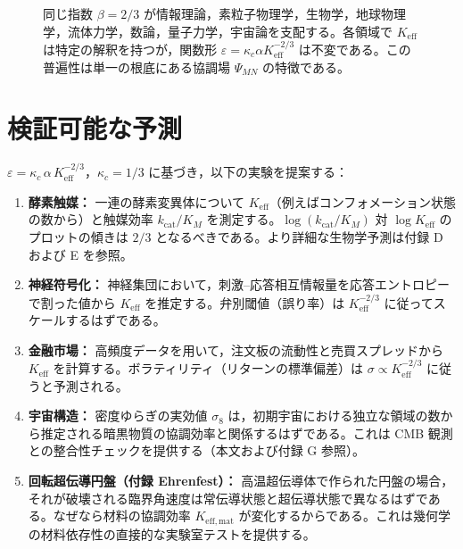 \documentclass[11pt,a4paper]{article}
\newcommand{\Keff}{K_{\mathrm{eff}}}
\newcommand{\eps}{\varepsilon}
\newcommand{\kappac}{\kappa_c}
\begin{document}
\begin{figure}[H]
		\caption{同じ指数 \(\beta = 2/3\) が情報理論，素粒子物理学，生物学，地球物理学，流体力学，数論，量子力学，宇宙論を支配する。各領域で \(K_{\mathrm{eff}}\) は特定の解釈を持つが，関数形 \(\varepsilon = \kappa_c \alpha K_{\mathrm{eff}}^{-2/3}\) は不変である。この普遍性は単一の根底にある協調場 \(\Psi_{MN}\) の特徴である。}
		\label{fig:unified-beta}
	\end{figure}
	
	\section{検証可能な予測}
	\label{sec:predictions}
	
	\(\eps = \kappac\,\alpha\,\Keff^{-2/3}\)，\(\kappac = 1/3\) に基づき，以下の実験を提案する：
	
	\begin{enumerate}
		\item \textbf{酵素触媒：} 一連の酵素変異体について \(\Keff\)（例えばコンフォメーション状態の数から）と触媒効率 \(k_{\text{cat}}/K_M\) を測定する。\(\log(k_{\text{cat}}/K_M)\) 対 \(\log \Keff\) のプロットの傾きは \(2/3\) となるべきである。より詳細な生物学予測は付録 D および E を参照。
		\item \textbf{神経符号化：} 神経集団において，刺激–応答相互情報量を応答エントロピーで割った値から \(\Keff\) を推定する。弁別閾値（誤り率）は \(\Keff^{-2/3}\) に従ってスケールするはずである。
		\item \textbf{金融市場：} 高頻度データを用いて，注文板の流動性と売買スプレッドから \(\Keff\) を計算する。ボラティリティ（リターンの標準偏差）は \(\sigma \propto \Keff^{-2/3}\) に従うと予測される。
		\item \textbf{宇宙構造：} 密度ゆらぎの実効値 \(\sigma_8\) は，初期宇宙における独立な領域の数から推定される暗黒物質の協調効率と関係するはずである。これは CMB 観測との整合性チェックを提供する（本文および付録 G 参照）。
		\item \textbf{回転超伝導円盤（付録 Ehrenfest）：} 高温超伝導体で作られた円盤の場合，それが破壊される臨界角速度は常伝導状態と超伝導状態で異なるはずである。なぜなら材料の協調効率 \(K_{\mathrm{eff,mat}}\) が変化するからである。これは幾何学の材料依存性の直接的な実験室テストを提供する。
	\end{enumerate}
	
\end{document}
